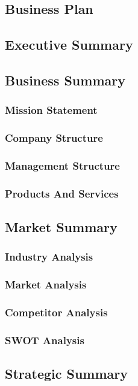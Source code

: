 \documentclass[11pt,a4paper]{article}
\begin{document}
\begin{appendices}

\section{Business Plan}

\subsection{Executive Summary}

\subsection{Business Summary}
\subsubsection{Mission Statement}
\subsubsection{Company Structure}
\subsubsection{Management Structure}
\subsubsection{Products And Services}

\subsection{Market Summary}
\subsubsection{Industry Analysis}
\subsubsection{Market Analysis}
\subsubsection{Competitor Analysis}
\subsubsection{SWOT Analysis}

\subsection{Strategic Summary}

\end{appendices}
\end{document}
